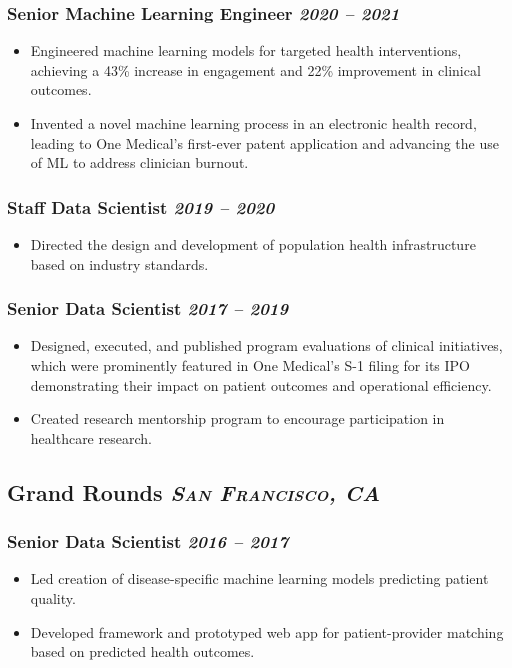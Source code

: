\documentclass[11pt]{article}
\newcommand{\rside}[1]{
  \hfill {\itshape #1}%
}
\begin{document}
\subsubsection{Senior Machine Learning Engineer\rside{2020 -- 2021}}
\begin{itemize}[label=-]
  \item Engineered machine learning models for targeted health interventions, achieving a 43\% increase in engagement and 22\% improvement in clinical outcomes.
  \item Invented a novel machine learning process in an electronic health record, leading to One Medical's first-ever patent application and advancing the use of ML to address clinician burnout.
\end{itemize}
\subsubsection{Staff Data Scientist\rside{2019 -- 2020}}
\begin{itemize}[label=-]
    \item Directed the design and development of population health infrastructure based on industry standards.
\end{itemize}
\subsubsection{Senior Data Scientist\rside{2017 -- 2019}}
\begin{itemize}[label=-]
\item Designed, executed, and published program evaluations of clinical initiatives, which were prominently featured in One Medical’s S-1 filing for its IPO demonstrating their impact on patient outcomes and operational efficiency.
\item Created research mentorship program to encourage participation in healthcare research.
\end{itemize}

\subsection{Grand Rounds \rside{\normalfont\large\bfseries\scshape{San Francisco, CA}}}
\subsubsection{Senior Data Scientist\rside{2016 -- 2017}}
\begin{itemize}[label=-]
    \item Led creation of disease-specific machine learning models predicting patient quality.
    \item Developed framework and prototyped web app for patient-provider matching based on predicted health outcomes. 
\end{itemize}
\end{document}
